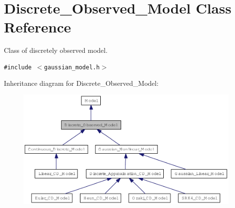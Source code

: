 \hypertarget{class_discrete___observed___model}{
\section{Discrete\_\-Observed\_\-Model Class Reference}
\label{class_discrete___observed___model}
}
Class of discretely observed model.  


{\tt \#include $<$gaussian\_\-model.h$>$}

Inheritance diagram for Discrete\_\-Observed\_\-Model:\nopagebreak
\begin{figure}[H]
\begin{center}
\leavevmode
\includegraphics[width=400pt]{class_discrete___observed___model__inherit__graph}
\end{center}
\end{figure}
